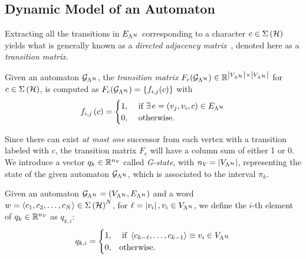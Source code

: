 \subsection{Dynamic Model of an Automaton}
\label{ssec:dynamicgraph}
%
Extracting all the transitions in $E_{\Lambda^{\mathcal{H}}}$ corresponding to a character $c \in \Sigma\left(\mathcal{H}\right)$ yields what is generally known as a \emph{directed adjacency matrix}~\cite{xu2012matrix}, denoted here as a \emph{transition matrix}.
\begin{definition}%
    \label{def:transition}%
    Given an automaton $\mathcal{G}_{\Lambda^{\mathcal{H}}}$, the \emph{transition matrix} $F_{c} ( \mathcal{G}_{\Lambda^{\mathcal{H}}} ) \in \mathbb{R}^{\left|V_{\Lambda^{\mathcal{H}}}\right| \times \left|V_{\Lambda^{\mathcal{H}}}\right|}$ for $c\in\Sigma\left(\mathcal{H}\right)$, is computed as $F_{c} ( \mathcal{G}_{\Lambda^{\mathcal{H}}} ) = \{f_{i,j}(c)\}$ with
    \begin{equation*}
        f_{i,j}\left( c \right)=
        \begin{cases}
            1, &\text{ if } \exists \, e=(v_j,v_i,c) \in E_{\Lambda^{\mathcal{H}}} \\
            0, &\text{ otherwise.}
        \end{cases}
        \end{equation*}%
\end{definition}
%
Since there can exist \emph{at most one} successor from each vertex with a transition labeled with $c$, the transition matrix $F_c$ will have a column sum of either 1 or 0.
We introduce a vector $q_k\in \mathbb{R}^{n_{V_{}}}$ called \emph{G-state}, with $n_{V_{}} =\left|V_{\Lambda^{\mathcal{H}}}\right|$, representing the state of the given automaton $\mathcal{G}_{\Lambda^{\mathcal{H}}}$, which is associated to the interval $\pi_k$.
%
\begin{definition}[G-state]%
    \label{def:qt}%
    Given an automaton $\mathcal{G}_{\Lambda^{\mathcal{H}}} = (V_{\Lambda^{\mathcal{H}}}, E_{\Lambda^{\mathcal{H}}})$ and a word $w = \left\langle c_1,c_2,\dots,c_N\right\rangle \in \Sigma\left( \mathcal{H} \right)^N$, for $\ell = \left|v_i\right|, v_i\in V_{\Lambda^{\mathcal{H}}}$, we define the $i$-th element of $q_k\in \mathbb{R}^{n_{V_{}}}$ as $q_{k,i}$:
    \begin{equation*}
        q_{k,i}=
        \begin{cases}
            1, &\text{ if } \left\langle c_{k-\ell},\dots,c_{k-1}\right\rangle \equiv v_i \in V_{\Lambda^{\mathcal{H}}} \\
            0, &\text{otherwise}.
        \end{cases}
    \end{equation*}
\end{definition}
